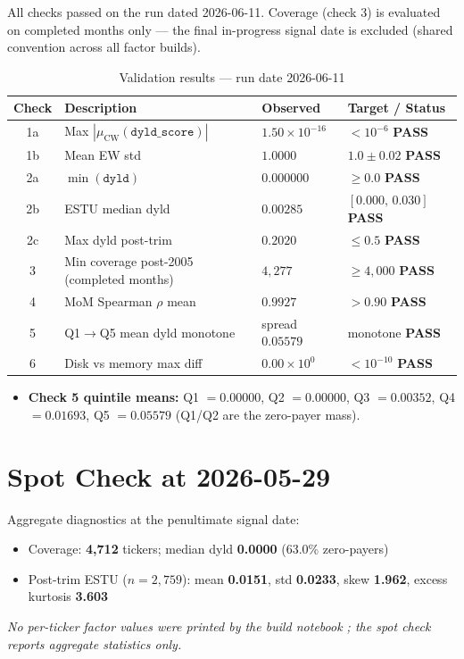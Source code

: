 \documentclass[11pt,a4paper]{article}
\newcommand{\PASS}[1]{\textcolor{pass}{\textbf{#1}}}
\newcommand{\NOTE}[1]{\textcolor{note}{\textit{#1}}}
\begin{document}
All checks passed on the run dated 2026-06-11. Coverage (check 3) is evaluated
on completed months only --- the final in-progress signal date is excluded
(shared convention across all factor builds).

\begin{table}[h!]
\centering
\caption{Validation results --- run date 2026-06-11}
\small
\begin{tabular}{clll}
\toprule
\textbf{Check} & \textbf{Description} & \textbf{Observed} & \textbf{Target / Status} \\
\midrule
1a & Max $|\mu_{\text{CW}}(\texttt{dyld\_score})|$ & $1.50\times10^{-16}$ & $<10^{-6}$ \quad \PASS{PASS} \\
1b & Mean EW std & $1.0000$ & $1.0\pm0.02$ \quad \PASS{PASS} \\
2a & $\min(\texttt{dyld})$ & $0.000000$ & $\geq0.0$ \quad \PASS{PASS} \\
2b & ESTU median dyld & $0.00285$ & $[0.000,\,0.030]$ \quad \PASS{PASS} \\
2c & Max dyld post-trim & $0.2020$ & $\leq0.5$ \quad \PASS{PASS} \\
3 & Min coverage post-2005 (completed months) & $4{,}277$ & $\geq4{,}000$ \quad \PASS{PASS} \\
4 & MoM Spearman $\rho$ mean & $0.9927$ & $>0.90$ \quad \PASS{PASS} \\
5 & Q1$\to$Q5 mean dyld monotone & spread $0.05579$ & monotone \quad \PASS{PASS} \\
6 & Disk vs memory max diff & $0.00\times10^{0}$ & $<10^{-10}$ \quad \PASS{PASS} \\
\bottomrule
\end{tabular}
\end{table}

\begin{itemize}[leftmargin=*,topsep=2pt,itemsep=2pt]
  \item \textbf{Check 5 quintile means:} Q1 $=0.00000$, Q2 $=0.00000$, Q3 $=0.00352$, Q4 $=0.01693$, Q5 $=0.05579$ (Q1/Q2 are the zero-payer mass).
\end{itemize}

\section{Spot Check at 2026-05-29}

Aggregate diagnostics at the penultimate signal date:

\begin{itemize}[leftmargin=*,topsep=2pt,itemsep=2pt]
  \item Coverage: \textbf{4{,}712} tickers; median dyld \textbf{0.0000} (63.0\% zero-payers)
  \item Post-trim ESTU ($n=2{,}759$): mean \textbf{0.0151}, std \textbf{0.0233}, skew \textbf{1.962}, excess kurtosis \textbf{3.603}
\end{itemize}

\NOTE{No per-ticker factor values were printed by the build notebook
; the spot check reports aggregate statistics only.}
\end{document}
